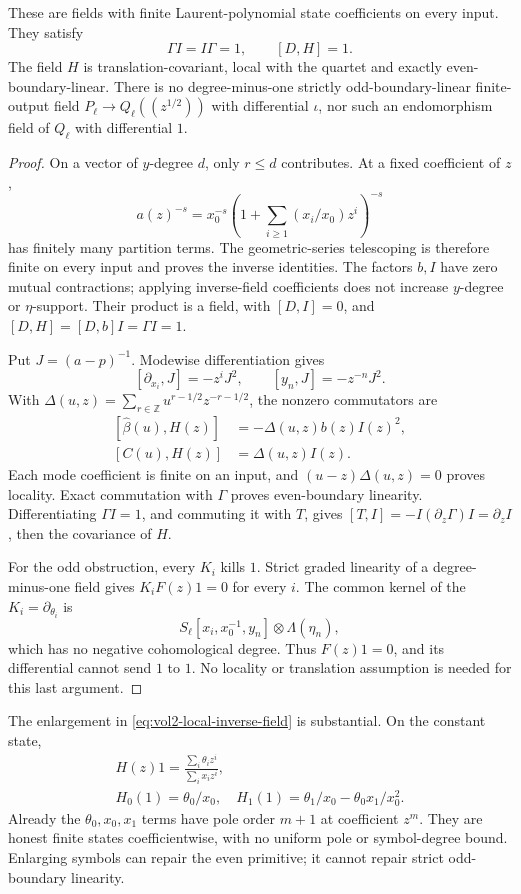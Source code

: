 \begin{proposition}\label{prop:vol2-local-inverse-homotopy}
These are fields with finite Laurent-polynomial state
coefficients on every input. They satisfy
\[
 \Gamma I=I\Gamma=1,\qquad [D,H]=1.
\]
The field \(H\) is translation-covariant, local with the
quartet and exactly even-boundary-linear.
There is no degree-minus-one strictly odd-boundary-linear
finite-output field \(P_\ell\to Q_\ell((z^{1/2}))\) with
differential \(\iota\), nor such an endomorphism field of
\(Q_\ell\) with differential \(1\).
\end{proposition}
\begin{proof}
On a vector of \(y\)-degree \(d\), only \(r\le d\) contributes.
At a fixed coefficient of \(z\),
\[
 a(z)^{-s}=x_0^{-s}
       \left(1+\sum_{i\ge1}(x_i/x_0)z^i\right)^{-s}
\]
has finitely many partition terms. The geometric-series
telescoping is therefore finite on every input and proves
the inverse identities. The factors \(b,I\) have zero
mutual contractions; applying inverse-field coefficients
does not increase \(y\)-degree or \(\eta\)-support.
Their product is a field, with \([D,I]=0\), and
\([D,H]=[D,b]I=\Gamma I=1\).

Put \(J=(a-p)^{-1}\). Modewise differentiation gives
\[
 [\partial_{x_i},J]=-z^iJ^2,\qquad
 [y_n,J]=-z^{-n}J^2.
\]
With
\(\Delta(u,z)=\sum_{r\in\mathbb Z}u^{r-1/2}z^{-r-1/2}\),
the nonzero commutators are
\[
 \begin{aligned}
 [\widehat\beta(u),H(z)]&=-\Delta(u,z)b(z)I(z)^2,\\
 [C(u),H(z)]&=\Delta(u,z)I(z).
 \end{aligned}
\]
Each mode coefficient is finite on an input, and
\((u-z)\Delta(u,z)=0\) proves locality.
Exact commutation with \(\Gamma\) proves even-boundary
linearity. Differentiating \(\Gamma I=1\), and commuting it
with \(T\), gives
\([T,I]=-I(\partial_z\Gamma)I=\partial_zI\), then the
covariance of \(H\).

For the odd obstruction, every \(K_i\) kills \(1\).
Strict graded linearity of a degree-minus-one field gives
\(K_iF(z)1=0\) for every \(i\). The common kernel of the
\(K_i=\partial_{\theta_i}\) is
\[
 S_\ell[x_i,x_0^{-1},y_n]\otimes\Lambda(\eta_n),
\]
which has no negative cohomological degree. Thus \(F(z)1=0\),
and its differential cannot send \(1\) to \(1\).
No locality or translation assumption is needed for this
last argument.
\end{proof}

The enlargement in \eqref{eq:vol2-local-inverse-field} is
substantial. On the constant state,
\[
 \begin{gathered}
 H(z)1=\frac{\sum_i\theta_i z^i}{\sum_i x_i z^i},\\
 H_0(1)=\theta_0/x_0,\quad
 H_1(1)=\theta_1/x_0-\theta_0x_1/x_0^2.
 \end{gathered}
\]
Already the \(\theta_0,x_0,x_1\) terms have pole order
\(m+1\) at coefficient \(z^m\). They are honest finite
states coefficientwise, with no uniform pole or symbol-degree
bound. Enlarging symbols can repair the even primitive;
it cannot repair strict odd-boundary linearity.

